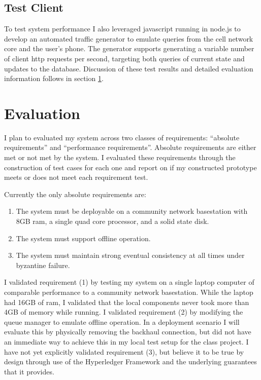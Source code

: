 \subsection{Test Client}

To test system performance I also leveraged javascript running in
node.js to develop an automated traffic generator to emulate queries
from the cell network core and the user's phone. The generator
supports generating a variable number of client http requests per
second, targeting both queries of current state and updates to the
database. Discussion of these test results and detailed evaluation
information follows in section \ref{evaluation}.

\section{Evaluation} \label{evaluation}

I plan to evaluated my system across two classes of requirements:
``absolute requirements'' and ``performance requirements''. Absolute
requirements are either met or not met by the system. I evaluated
these requirements through the construction of test cases for each one
and report on if my constructed prototype meets or does not meet each
requirement test.

Currently the only absolute requirements are:
\begin{enumerate}
\item The system must be deployable on a community network basestation
  with 8GB ram, a single quad core processor, and a solid state disk.
\item The system must support offline operation.
\item The system must maintain strong eventual consistency at all
  times under byzantine failure.
\end{enumerate}

I validated requirement (1) by testing my system on a single laptop
computer of comparable performance to a community network
basestation. While the laptop had 16GB of ram, I validated that the
local components never took more than 4GB of memory while running. I
validated requirement (2) by modifying the queue manager to emulate
offline operation. In a deployment scenario I will evaluate this by
physically removing the backhaul connection, but did not have an
immediate way to achieve this in my local test setup for the class
project. I have not yet explicitly validated requirement (3), but
believe it to be true by design through use of the Hyperledger
Framework and the underlying guarantees that it provides.

